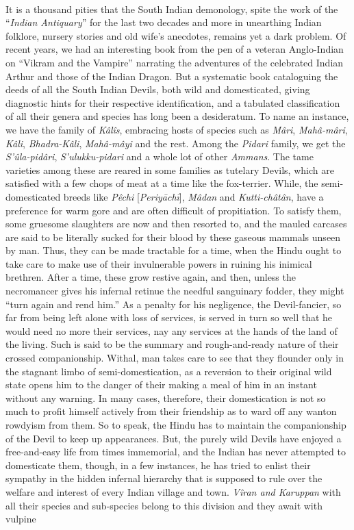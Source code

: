 \documentclass[a4paper, 12pt, oneside, english]{article}
\begin{document}
\paragraph{}
It is a thousand pities that the South Indian demonology, spite the work of the ``\emph{Indian Antiquary}'' for the last two decades and more in unearthing Indian folklore, nursery stories and old wife's anecdotes, remains yet a dark problem. Of recent years, we had an interesting book from the pen of a veteran Anglo-Indian on ``Vikram and the Vampire'' narrating the adventures of the celebrated Indian Arthur and those of the Indian Dragon. But a systematic book cataloguing the deeds of all the South Indian Devils, both wild and domesticated, giving diagnostic hints for their respective identification, and a tabulated classification of all their genera and species has long been a desideratum. To name an instance, we have the family of \emph{Kâlîs}, embracing hosts of species such as \emph{Mâri}, \emph{Mahâ-mâri}, \emph{Kâli}, \emph{Bhadra-Kâli}, \emph{Mahâ-mâyi} and the rest. Among the \emph{Pidari} family, we get the \emph{S'ûla-pidâri}, \emph{S'ulukku-pidari} and a whole lot of other \emph{Ammans}. The tame varieties among these are reared in some families as tutelary Devils, which are satisfied with a few chops of meat at a time like the fox-terrier. While, the semi-domesticated breeds like \emph{Pêchi} [\emph{Periyāchī}], \emph{Mâdan} and \emph{Kutti-châtân}, have a preference for warm gore and are often difficult of propitiation. To satisfy them, some gruesome slaughters are now and then resorted to, and the mauled carcases are said to be literally sucked for their blood by these gaseous mammals unseen by man. Thus, they can be made tractable for a time, when the Hindu ought to take care to make use of their invulnerable powers in ruining his inimical brethren. After a time, these grow restive again, and then, unless the necromancer gives his infernal retinue the needful sanguinary fodder, they might ``turn again and rend him.'' As a penalty for his negligence, the Devil-fancier, so far from being left alone with loss of services, is served in turn so well that he would need no more their services, nay any services at the hands of the land of the living. Such is said to be the summary and rough-and-ready nature of their crossed companionship. Withal, man takes care to see that they flounder only in the stagnant limbo of semi-domestication, as a reversion to their original wild state opens him to the danger of their making a meal of him in an instant without any warning. In many cases, therefore, their domestication is not so much to profit himself actively from their friendship as to ward off any wanton rowdyism from them. So to speak, the Hindu has to maintain the companionship of the Devil to keep up appearances. But, the purely wild Devils have enjoyed a free-and-easy life from times immemorial, and the Indian has never attempted to domesticate them, though, in a few instances, he has tried to enlist their sympathy in the hidden infernal hierarchy that is supposed to rule over the welfare and interest of every Indian village and town. \emph{Vîran and Karuppan} with all their species and sub-species belong to this division and they await with vulpine 
\end{document}
